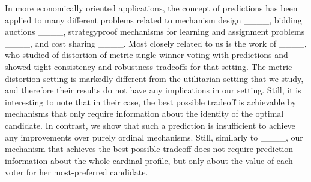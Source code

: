 In more economically oriented applications, the concept of predictions has been applied to many different problems related to mechanism design ____, bidding auctions ____, strategyproof mechanisms for learning and assignment problems ____, and cost sharing ____. Most closely related to us is the work of ____, who studied of distortion of metric single-winner voting with predictions and showed tight consistency and robustness tradeoffs for that setting. The metric distortion setting is markedly different from the utilitarian setting that we study, and therefore their results do not have any implications in our setting. Still, it is interesting to note that in their case, the best possible tradeoff is achievable by mechanisms that only require information about the identity of the optimal candidate. In contrast, we show that such a prediction is insufficient to achieve any improvements over purely ordinal mechanisms. Still, similarly to ____, our mechanism that achieves the best possible tradeoff does not require prediction information about the whole cardinal profile, but only about the value of each voter for her most-preferred candidate. 



